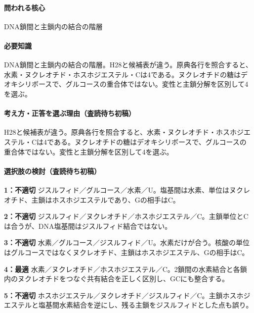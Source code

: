 \paragraph{問われる核心} DNA鎖間と主鎖内の結合の階層

\paragraph{必要知識} DNA鎖間と主鎖内の結合の階層。H28と候補表が違う。原典各行を照合すると、水素・ヌクレオチド・ホスホジエステル・Cは4である。ヌクレオチドの糖はデオキシリボースで、グルコースの重合体ではない。変性と主鎖分解を区別して4を選ぶ。

\paragraph{考え方・正答を選ぶ理由（査読待ち初稿）} H28と候補表が違う。原典各行を照合すると、水素・ヌクレオチド・ホスホジエステル・Cは4である。ヌクレオチドの糖はデオキシリボースで、グルコースの重合体ではない。変性と主鎖分解を区別して4を選ぶ。

\paragraph{選択肢の検討（査読待ち初稿）}\mbox{}\par

\noindent\textbf{1：不適切} ジスルフィド／グルコース／水素／U。塩基間は水素、単位はヌクレオチド、主鎖はホスホジエステルであり、Gの相手はC。\par

\noindent\textbf{2：不適切} ジスルフィド／ヌクレオチド／ホスホジエステル／C。主鎖単位とCは合うが、DNA塩基間はジスルフィド結合ではない。\par

\noindent\textbf{3：不適切} 水素／グルコース／ジスルフィド／U。水素だけが合う。核酸の単位はグルコースではなくヌクレオチド、主鎖はホスホジエステル、Gの相手はC。\par

\noindent\textbf{4：最適} 水素／ヌクレオチド／ホスホジエステル／C。2鎖間の水素結合と各鎖内のヌクレオチドをつなぐ共有結合を正しく区別し、GCにも整合する。\par

\noindent\textbf{5：不適切} ホスホジエステル／ヌクレオチド／ジスルフィド／C。主鎖ホスホジエステルと塩基間水素結合を逆にし、残る主鎖をジスルフィドとした点も誤り。\par

